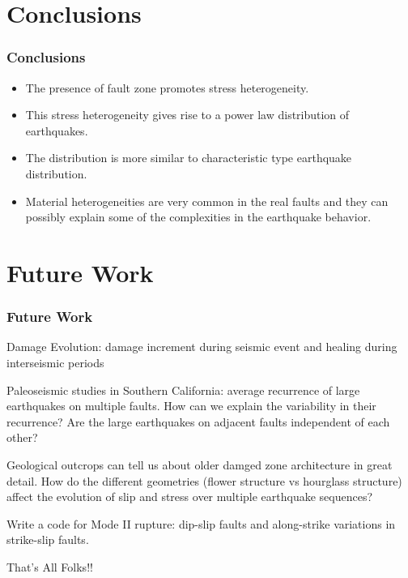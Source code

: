 \documentclass{beamer}
\begin{document}
\section{Conclusions}
\begin{frame}
    \frametitle{Conclusions}
    \begin{itemize}
        \item The presence of fault zone promotes stress heterogeneity.
        \item This stress heterogeneity gives rise to a power law distribution of earthquakes.
        \item The distribution is more similar to characteristic type earthquake distribution.
        \item Material heterogeneities are very common in the real faults and they can possibly explain some of the complexities in the earthquake behavior.
        \end{itemize}
\end{frame}

\section{Future Work}
\begin{frame}
\frametitle{Future Work}
    \item Damage Evolution: damage increment during seismic event and healing during interseismic periods
    \item Paleoseismic studies in Southern California: average recurrence of large earthquakes on multiple faults. How can we explain the variability in their recurrence? Are the large earthquakes on adjacent faults independent of each other?
    \item Geological outcrops can tell us about older damged zone architecture in great detail. How do the different geometries (flower structure vs hourglass structure) affect the evolution of slip and stress over multiple earthquake sequences?
    \item Write a code for Mode II rupture: dip-slip faults and along-strike variations in strike-slip faults.
\end{frame}

\begin{frame}
    \Huge{\centerline{That's All Folks!!}}
\end{frame}
\end{document}

